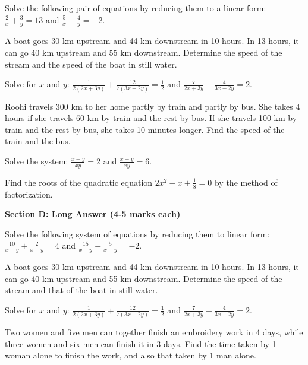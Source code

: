 \documentclass[12pt,a4paper]{exam}
\begin{document}
\begin{questions}
\question[3] Solve the following pair of equations by reducing them to a linear form: $\frac{2}{x} + \frac{3}{y} = 13$ and $\frac{5}{x} - \frac{4}{y} = -2$.
\vspace{0.15cm}

\question[3] A boat goes 30 km upstream and 44 km downstream in 10 hours. In 13 hours, it can go 40 km upstream and 55 km downstream. Determine the speed of the stream and the speed of the boat in still water.
\vspace{0.15cm}

\question[3] Solve for $x$ and $y$: $\frac{1}{2(2x+3y)} + \frac{12}{7(3x-2y)} = \frac{1}{2}$ and $\frac{7}{2x+3y} + \frac{4}{3x-2y} = 2$.
\vspace{0.15cm}

\question[3] Roohi travels 300 km to her home partly by train and partly by bus. She takes 4 hours if she travels 60 km by train and the rest by bus. If she travels 100 km by train and the rest by bus, she takes 10 minutes longer. Find the speed of the train and the bus.
\vspace{0.15cm}

\question[3] Solve the system: $\frac{x+y}{xy} = 2$ and $\frac{x-y}{xy} = 6$.
\vspace{0.15cm}

\question[3] Find the roots of the quadratic equation $2x^2 - x + \frac{1}{8} = 0$ by the method of factorization.
\vspace{0.15cm}

\end{questions}
\bigskip
\noindent\textbf{\large Section D: Long Answer (4-5 marks each)}

\begin{questions}
\question[5] Solve the following system of equations by reducing them to linear form: $\frac{10}{x+y} + \frac{2}{x-y} = 4$ and $\frac{15}{x+y} - \frac{5}{x-y} = -2$.
\vspace{0.15cm}

\question[5] A boat goes 30 km upstream and 44 km downstream in 10 hours. In 13 hours, it can go 40 km upstream and 55 km downstream. Determine the speed of the stream and that of the boat in still water.
\vspace{0.15cm}

\question[5] Solve for $x$ and $y$: $\frac{1}{2(2x+3y)} + \frac{12}{7(3x-2y)} = \frac{1}{2}$ and $\frac{7}{2x+3y} + \frac{4}{3x-2y} = 2$.
\vspace{0.15cm}

\question[5] Two women and five men can together finish an embroidery work in 4 days, while three women and six men can finish it in 3 days. Find the time taken by 1 woman alone to finish the work, and also that taken by 1 man alone.
\vspace{0.15cm}

\end{questions}
\bigskip
\end{document}
